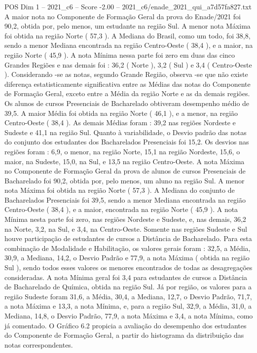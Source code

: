 \begin{textsample}{POS Dim 1 – 2021\_c6 – Score -2.00 – 2021\_c6/enade\_2021\_qui\_a7d57fa827.txt}
A maior nota no Componente de Formação Geral da prova do Enade/2021 foi 90,2, obtida por, pelo menos, um estudante na região Sul.
A menor nota Máxima foi obtida na região Norte ( 57,3 ).
A Mediana do Brasil, como um todo, foi 38,8, sendo a menor Mediana encontrada na região Centro-Oeste ( 38,4 ), e a maior, na região Norte ( 45,9 ).
A nota Mínima nessa parte foi zero em duas das cinco Grandes Regiões e nas demais foi : 36,2 ( Norte ), 3,2 ( Sul ) e 3,4 ( Centro-Oeste ).
Considerando -se as notas, segundo Grande Região, observa -se que não existe diferença estatisticamente significativa entre as Médias das notas do Componente de Formação Geral, exceto entre a Média da região Norte e as da demais regiões.
Os alunos de cursos Presenciais de Bacharelado obtiveram desempenho médio de 39,5.
A maior Média foi obtida na região Norte ( 46,1 ), e a menor, na região Centro-Oeste ( 38,4 ).
As demais Médias foram : 39,2 nas regiões Nordeste e Sudeste e 41,1 na região Sul.
Quanto à variabilidade, o Desvio padrão das notas do conjunto dos estudantes dos Bacharelados Presenciais foi 15,2.
Os desvios nas regiões foram : 6,9, o menor, na região Norte, 15,1 na região Nordeste, 15,6, o maior, na Sudeste, 15,0, na Sul, e 13,5 na região Centro-Oeste.
A nota Máxima no Componente de Formação Geral da prova de alunos de cursos Presenciais de Bacharelado foi 90,2, obtida por, pelo menos, um aluno na região Sul.
A menor nota Máxima foi obtida na região Norte ( 57,3 ).
A Mediana do conjunto de Bacharelados Presenciais foi 39,5, sendo a menor Mediana encontrada na região Centro-Oeste ( 38,4 ), e a maior, encontrada na região Norte ( 45,9 ).
A nota Mínima nesta parte foi zero, nas regiões Nordeste e Sudeste, e, nas demais, 36,2 na Norte, 3,2, na Sul, e 3,4, na Centro-Oeste.
Somente nas regiões Sudeste e Sul houve participação de estudantes de cursos a Distância de Bacharelado.
Para esta combinação de Modalidade e Habilitação, os valores gerais foram : 32,5, a Média, 30,9, a Mediana, 14,2, o Desvio Padrão e 77,9, a nota Máxima ( obtida na região Sul ), sendo todos esses valores os menores encontrados de todas as desagregações consideradas.
A nota Mínima geral foi 3,4 para estudantes de cursos a Distância de Bacharelado de Química, obtida na região Sul.
Já por região, os valores para a região Sudeste foram 31,6, a Média, 30,4, a Mediana, 12,7, o Desvio Padrão, 71,7, a nota Máxima e 13,3, a nota Mínima, e, para a região Sul, 32,9, a Média, 31,0, a Mediana, 14,8, o Desvio Padrão, 77,9, a nota Máxima e 3,4, a nota Mínima, como já comentado.
O Gráfico 6.2 propicia a avaliação do desempenho dos estudantes do Componente de Formação Geral, a partir do histograma da distribuição das notas correspondentes.

\end{textsample}
